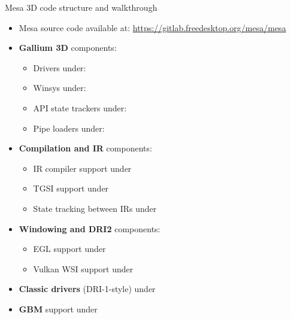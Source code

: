 \begin{frame}{Mesa 3D code structure and walkthrough}
  \begin{itemize}
  \item Mesa source code available at: \url{https://gitlab.freedesktop.org/mesa/mesa}
  \item \textbf{Gallium 3D} components:
    \begin{itemize}
    \item Drivers under: 
    \item Winsys under: 
    \item API state trackers under: 
    \item Pipe loaders under: 
    \end{itemize}
  \item \textbf{Compilation and IR} components:
    \begin{itemize}
    \item IR compiler support under 
    \item TGSI support under 
    \item State tracking between IRs under 
    \end{itemize}
  \item \textbf{Windowing and DRI2} components:
    \begin{itemize}
    \item EGL support under 
    \item Vulkan WSI support under 
    \end{itemize}
  \item \textbf{Classic drivers} (DRI-1-style) under 
  \item \textbf{GBM} support under 
  \end{itemize}
\end{frame}

